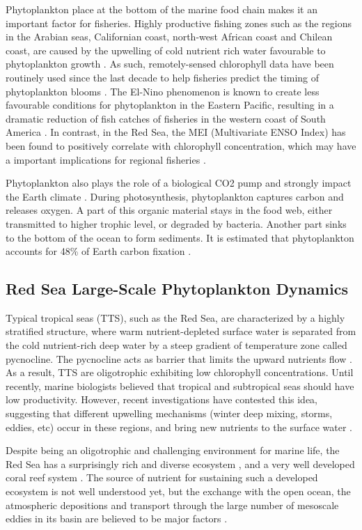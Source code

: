 Phytoplankton place at the bottom of the marine food chain makes it an
important factor for fisheries. Highly productive fishing zones such as the
regions in the Arabian seas, Californian coast, north-west African coast and
Chilean coast, are caused by the upwelling of cold nutrient rich water
favourable to phytoplankton growth \citep{Mann2006}.  As such, remotely-sensed
chlorophyll data have been routinely used since the last decade to help
fisheries predict the timing of phytoplankton blooms \citep{Robinson2010}. The
El-Nino phenomenon is known to create less favourable conditions for
phytoplankton in the Eastern Pacific, resulting in a dramatic reduction of fish
catches of fisheries in the western coast of South America
\citep{Robinson2010}. In contrast, in the Red Sea, the MEI (Multivariate ENSO
Index) has been found to positively correlate with chlorophyll concentration,
which may have a important implications for regional fisheries
\citep{Raitsos2015}.

Phytoplankton also plays the role of a biological CO2 pump and strongly impact
the Earth climate \citep{Mann2006}. During photosynthesis, phytoplankton
captures carbon and releases oxygen. A part of this organic material stays in
the food web, either transmitted to higher trophic level, or degraded  by
bacteria. Another part sinks to the bottom of the ocean to form sediments. It
is estimated that phytoplankton accounts for 48\% of Earth carbon fixation
\citep{Pal2014}.

\subsection{Red Sea Large-Scale Phytoplankton Dynamics}

Typical tropical seas (TTS), such as the Red Sea, are characterized by a highly
stratified structure, where warm nutrient-depleted surface water is separated
from the cold nutrient-rich deep water by a steep gradient of temperature zone
called pycnocline. The pycnocline acts as barrier that limits the upward
nutrients flow \citep{Mann2006}. As a result, TTS are oligotrophic exhibiting
low chlorophyll concentrations. Until recently, marine biologists believed that
tropical and subtropical seas should have low productivity. However, recent
investigations have contested this idea, suggesting that different upwelling
mechanisms (winter deep mixing, storms, eddies, etc) occur in these regions,
and bring new nutrients to the surface water \citep{Mann2006}.

Despite being an oligotrophic and challenging environment for marine life, the
Red Sea has a surprisingly rich and diverse ecosystem \citep{Raitsos2011}, and
a very well developed coral reef system \citep{Racault}. The source of nutrient
for sustaining such a developed ecosystem is not well understood yet, but the
exchange with the open ocean, the atmospheric depositions and transport through
the large number of mesoscale eddies in its basin are believed to be major
factors \citep{Raitsos2013, Zhan2014}.

